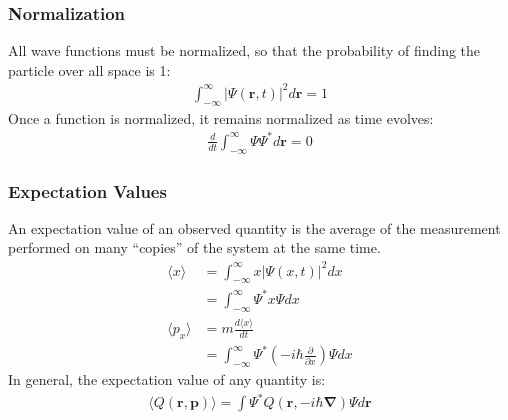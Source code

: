 \documentclass[11pt, letterpaper]{article}
\newcommand{\ve}[1]{
  \ensuremath{\bm{#1}}}	               %
\newcommand{\cc}[1]{
  \ensuremath{#1^{\ast}}}              %
\newcommand{\pd}[2]{
  \ensuremath{
    \frac{\partial #1}{\partial #2} }} %
\newcommand{\ave}[1]{
  \ensuremath{\langle #1 \rangle}}     %
\begin{document}
\begin{multicols*}{3}
\subsubsection{Normalization}
All wave functions must be normalized, so that the probability of finding the
particle over all space is 1:
\begin{align*}
  \int_{-\infty}^{\infty} |\Psi(\ve{r},t)|^2 d\ve{r} = 1
\end{align*}
Once a function is normalized, it remains normalized as time evolves:
\begin{align*}
  \frac{d}{dt} \int_{-\infty}^{\infty} \Psi \cc{\Psi} d\ve{r} = 0
\end{align*}
\subsubsection{Expectation Values}
An expectation value of an observed quantity is the average of the measurement
performed on many ``copies'' of the system at the same time.
\begin{align*}
  \ave{x} &= \int_{-\infty}^{\infty} x |\Psi(x,t)|^2 dx \\
  &= \int_{-\infty}^{\infty} \cc{\Psi} x \Psi dx \\
  \ave{p_x} &= m\frac{d\ave{x}}{dt} \\
  &= \int_{-\infty}^{\infty} \cc{\Psi} \left( -i\hbar \pd{}{x} \right) \Psi dx
\end{align*}
In general, the expectation value of any quantity is:
\begin{align*}
  \ave{Q(\ve{r}, \ve{p})} = \int \cc{\Psi} Q\left(\ve{r}, -i\hbar
    \ve{\nabla} \right) \Psi d\ve{r}
\end{align*}

\end{multicols*}
\end{document}
